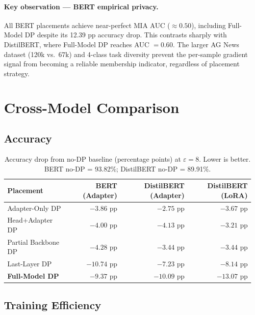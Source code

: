\documentclass[11pt,letterpaper]{article}
\newcommand{\eps}{\varepsilon}
\begin{document}
\paragraph{Key observation — BERT empirical privacy.}
All BERT placements achieve near-perfect MIA AUC ($\approx 0.50$), including
Full-Model DP despite its 12.39 pp accuracy drop.
This contrasts sharply with DistilBERT, where Full-Model DP reaches AUC $= 0.60$.
The larger AG News dataset (120k vs.\ 67k) and 4-class task diversity prevent
the per-sample gradient signal from becoming a reliable membership indicator,
regardless of placement strategy.

\bigskip
\section{Cross-Model Comparison}

\subsection{Accuracy}

\begin{table}[h]
\centering
\caption{Accuracy drop from no-DP baseline (percentage points) at $\eps=8$.
  Lower is better. BERT no-DP = 93.82\%; DistilBERT no-DP = 89.91\%.}
\label{tab:cross_model_acc}
\small
\setlength{\tabcolsep}{6pt}
\begin{tabular}{lrrr}
\toprule
\textbf{Placement}
  & \textbf{BERT} (Adapter)
  & \textbf{DistilBERT} (Adapter)
  & \textbf{DistilBERT} (LoRA) \\
\midrule
Adapter-Only DP    & $-3.86$ pp & $-2.75$ pp & $-3.67$ pp \\
Head+Adapter DP    & $-4.00$ pp & $-4.13$ pp & $-3.21$ pp \\
Partial Backbone DP & $-4.28$ pp & $-3.44$ pp & $-3.44$ pp \\
Last-Layer DP      & $-10.74$ pp & $-7.23$ pp & $-8.14$ pp \\
\textbf{Full-Model DP}
  & $\mathbf{-9.37}$ pp & $\mathbf{-10.09}$ pp & $\mathbf{-13.07}$ pp \\
\bottomrule
\end{tabular}
\end{table}

\subsection{Training Efficiency}
\end{document}
